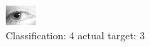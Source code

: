 \begin{figure}[h!]
\begin{center}
\includegraphics[width=0.60\columnwidth]{figures/ID1356_class_4_target_3.png}
\end{center}
\caption{ Classification: 4 actual target: 3}
\label{fig:ID1356_class_4_target_3}
\end{figure}

